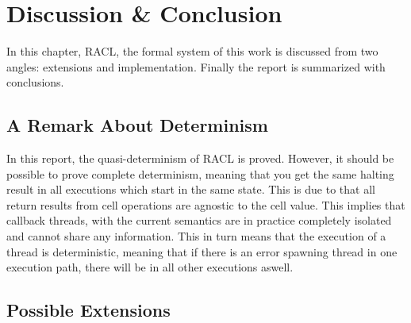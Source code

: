 \chapter{Discussion \& Conclusion}
\label{cha:discussion_and_conclusion}

In this chapter, RACL, the formal system of this work is discussed from two
angles: extensions and implementation. Finally the report is summarized with
conclusions.


\section{A Remark About Determinism}%
\label{sec:a_remark_about_determinism}

In this report, the quasi-determinism of RACL is proved. However, it
should be possible to prove complete determinism, meaning that you get the same
halting result in all executions which start in the same state. This is due to
that all return results from cell operations are agnostic to the cell value.
This implies that callback threads, with the current semantics are in practice
completely isolated and cannot share any information. This in turn means that
the execution of a thread is deterministic, meaning that if there is an error
spawning thread in one execution path, there will be in all other executions
aswell.

\section{Possible Extensions}%
\label{sec:extensions}

